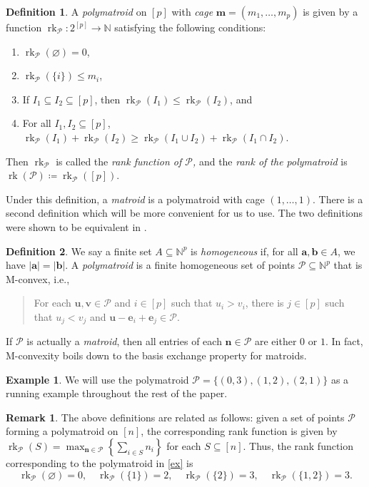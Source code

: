 \documentclass[a4paper, 11pt]{amsart}
\theoremstyle{definition}
\newtheorem{definition}[definition]{Definition}
\newtheorem{example}[example]{Example}
\newtheorem{remark}[remark]{Remark}
\newcommand{\bfu}{\mathbf{u}}
\newcommand{\bfv}{\mathbf{v}}
\newcommand{\bfm}{\mathbf{m}}
\newcommand{\bfn}{\mathbf{n}}
\newcommand{\bfa}{\mathbf{a}}
\newcommand{\bfb}{\mathbf{b}}
\newcommand{\bfe}{\mathbf{e}}
\newcommand{\sP}{\mathscr{P}}
\newcommand{\N}{\mathbb{N}}
\newcommand{\ds}{\displaystyle}
\DeclareMathOperator{\rk}{rk}
\begin{document}
\begin{definition} A \textit{polymatroid} on $[p]$ with \textit{cage} $\bfm = (m_1,\ldots,m_p)$ is given by a function $\rk_{\sP}\colon 2^{[p]} \to \N$ satisfying the following conditions:
\begin{enumerate}
    \item $\rk_{\sP}(\varnothing) = 0$,
    \item $\rk_{\sP}(\{i\}) \le m_i$,
    \item If $I_1 \subseteq I_2 \subseteq [p]$, then $\rk_{\sP}(I_1) \le \rk_{\sP}(I_2)$, and
    \item For all $I_1, I_2 \subseteq [p]$, $\rk_{\sP}(I_1) + \rk_{\sP}(I_2) \ge \rk_\sP(I_1 \cup I_2) + \rk_{\sP}(I_1 \cap I_2)$. 
\end{enumerate}
Then $\rk_{\sP}$ is called the \textit{rank function of $\sP$,} and the \textit{rank of the polymatroid }is $\rk(\sP)\coloneqq \rk_{\sP}([p])$. 
\end{definition}

Under this definition, a \textit{matroid} is a polymatroid with cage $(1,\ldots,1)$. There is a second definition which will be more convenient for us to use. The two definitions were shown to be equivalent in \cite[Theorem 3.4]{HH2002}.  

\begin{definition}\label{def:Mconvex}
    We say a finite set $A \subseteq \N^p$ is \textit{homogeneous} if, for all $\bfa, \bfb \in A$, we have $|\bfa| = |\bfb|$. A \textit{polymatroid} is a finite homogeneous set of points $\sP \subseteq \N^p$ that is M-convex, i.e., 
    \begin{quote}
        For each $\bfu, \bfv \in \sP$ and $i \in [p]$ such that $u_i > v_i$, there is $j \in [p]$ such that $u_j < v_j$ and $\bfu-\bfe_i+\bfe_j \in \sP$. 
    \end{quote}
\end{definition}
If $\sP$ is actually a \textit{matroid}, then all entries of each $\bfn \in \sP$ are either $0$ or $1$. In fact, M-convexity boils down to the basis exchange property for matroids. 

\begin{example}\label{ex}
    We will use the polymatroid $\sP = \{(0,3), (1,2), (2,1)\}$ as a running example throughout the rest of the paper. 
\end{example}

\begin{remark}
The above definitions are related as follows: given a set of points $\sP$ forming a polymatroid on $[n]$, the corresponding rank function is given by $\rk_\sP(S) = \ds\max_{\bfn \in \sP}\left\{\sum_{i \in S}n_i\right\}$ for each $S \subseteq [n]$. Thus, the rank function corresponding to the polymatroid in \autoref{ex} is $$\rk_\sP(\varnothing) = 0, \quad \rk_\sP(\{1\}) = 2, \quad \rk_\sP(\{2\}) = 3,  \quad \rk_\sP(\{1,2\}) = 3.$$ 
\end{remark}
\end{document}
